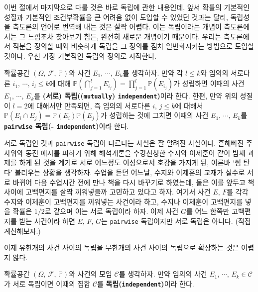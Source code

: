 이번 절에서 마지막으로 다룰 것은 바로 독립에 관한 내용인데, 앞서 확률의 기본적인 성질과 기본적인 조건부확률을 큰 어려움 없이 도입할 수 있었던 것과는 달리, 독립성을 측도론의 언어로 번역해 내는 것은 살짝 어렵다. 이는 독립이라는 개념이 측도론에서는 그 느낌조차 찾아보기 힘든, 완전히 새로운 개념이기 때문이다. 우리는 측도론에서 적분을 정의할 때와 비슷하게 독립을 그 정의를 점차 일반화시키는 방법으로 도입할 것이다. 우선 가장 기본적인 독립의 정의로 시작한다.

\begin{definition}
    확률공간 $(\Omega,\,\mathcal{F},\,\mathbb{P})$와 사건 $E_1,\,\cdots,\,E_k$를 생각하자. 만약 각 $l\leq k$와 임의의 서로다른 $i_1,\,\cdots,\,i_l\leq k$에 대해 $\mathbb{P}(\bigcap_{j=1}^lE_{i_j})=\prod_{j=1}^l\mathbb{P}(E_{i_j})$가 성립하면 이때의 사건 $E_1,\,\cdots,\,E_k$를 \textbf{(서로) 독립((\texttt{mutually}) \texttt{independent})}이라 한다. 한편, 만약 위의 성질이 $l=2$에 대해서만 만족되면, 즉 임의의 서로다른 $i,\,j\leq k$에 대해서 $\mathbb{P}(E_i\cap E_j)=\mathbb{P}(E_i)\mathbb{P}(E_j)$가 성립하는 것에 그치면 이때의 사건 $E_1,\,\cdots,\,E_k$를 \textbf{\texttt{pairwise} 독립(- \texttt{independent})}이라 한다.
\end{definition}

서로 독립인 것과 \texttt{pairwise} 독립이 다르다는 사실은 잘 알려진 사실이다. 흔해빠진 주사위와 동전 예시를 피하기 위해 해석개론을 수강신청한 수지와 이제훈이 같이 밤새 과제를 하게 된 것을 계기로 서로 어느정도 이성으로서 호감을 가지게 된, 이른바 `썸 탄다' 불리우는 상황을 생각하자. 수업을 듣던 어느날, 수지와 이제훈의 교재가 실수로 서로 바뀌어 다음 수업시간 전에 만나 책을 다시 바꾸기로 하였는데, 둘은 이를 앞두고 책 사이에 고백편지를 살짝 끼워넣을까 고민하고 있다고 하자. 여기서 사건 $E,\,F$를 각각 수지와 이제훈이 고백편지를 끼워넣는 사건이라 하고, 수지나 이제훈이 고백편지를 넣을 확률은 $1/2$로 같으며 이는 서로 독립이라 하자. 이제 사건 $G$를 어느 한쪽만 고백편지를 받는 사건이라 하면 $E,\,F,\,G$는 \texttt{pairwise} 독립이지만 서로 독립은 아니다. (직접 계산해보자.)

이제 유한개의 사건 사이의 독립을 무한개의 사건 사이의 독립으로 확장하는 것은 어렵지 않다.

\begin{definition}
    확률공간 $(\Omega,\,\mathcal{F},\,\mathbb{P})$와 사건의 모임 $\mathcal{C}$를 생각하자. 만약 임의의 사건 $E_1,\,\cdots,\,E_k\in\mathcal{C}$가 서로 독립이면 이때의 집합 $\mathcal{C}$를 \textbf{독립(\texttt{independent})}이라 한다.
\end{definition}

